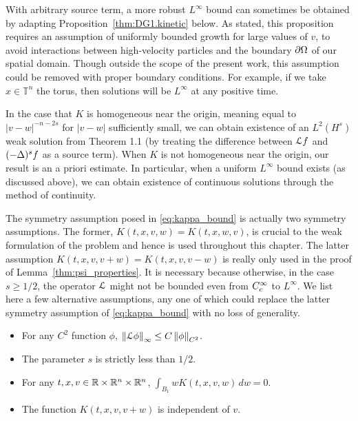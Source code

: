 With arbitrary source term, a more robust $L^\infty$ bound can sometimes be obtained by adapting Proposition~\ref{thm:DG1.kinetic} below.  As stated, this proposition requires an assumption of uniformly bounded growth for large values of $v$, to avoid interactions between high-velocity particles and the boundary $\partial \Omega$ of our spatial domain.  Though outside the scope of the present work, this assumption could be removed with proper boundary conditions.  For example, if we take $x \in \mathbb{T}^n$ the torus, then solutions will be $L^\infty$ at any positive time.  

In the case that $K$ is homogeneous near the origin, meaning equal to $|v-w|^{-n-2s}$ for $|v-w|$ sufficiently small, we can obtain existence of an $L^2(H^s)$ weak solution from \cite{MoXu} Theorem 1.1 (by treating the difference between $\mathcal{L} f$ and $(-\Delta)^sf$ as a source term).  When $K$ is not homogeneous near the origin, our result is an a priori estimate.  In particular, when a uniform $L^\infty$ bound exists (as discussed above), we can obtain existence of continuous solutions through the method of continuity.  


The symmetry assumption posed in \eqref{eq:kappa_bound} is actually two symmetry assumptions.  The former, $K(t,x,v,w) = K(t,x,w,v)$, is crucial to the weak formulation of the problem and hence is used throughout this chapter.  The latter assumption $K(t,x,v,v+w) = K(t,x,v,v-w)$ is really only used in the proof of Lemma~\ref{thm:psi_properties}.  It is necessary because otherwise, in the case $s \geq 1/2$, the operator $\mathcal{L}$ might not be bounded even from $C_c^\infty$ to $L^\infty$.  We list here a few alternative assumptions, any one of which could replace the latter symmetry assumption of \eqref{eq:kappa_bound} with no loss of generality.  
\begin{itemize}
\item For any $C^2$ function $\phi$, $\left\lVert\mathcal{L} \phi\right\rVert_\infty \leq C \left\lVert\phi\right\rVert_{C^2}$. 
\item The parameter $s$ is strictly less than $1/2$.  
\item For any $t,x,v \in \mathbb{R}\times\mathbb{R}^n\times\mathbb{R}^n$, $\int_{B_1} w K(t,x,v,w) \,dw = 0$.  
\item The function $K(t,x,v,v+w)$ is independent of $v$. 
\end{itemize}

